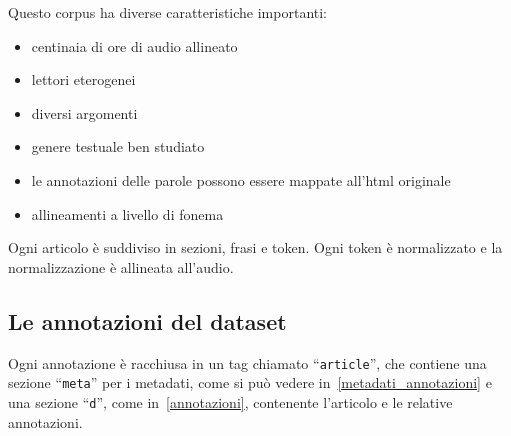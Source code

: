 \documentclass[12pt,a4paper,titlepage]{article}
\begin{document}
Questo corpus ha diverse caratteristiche importanti:
\begin{itemize}
	\item centinaia di ore di audio allineato
	\item lettori eterogenei
	\item diversi argomenti
	\item genere testuale ben studiato
	\item le annotazioni delle parole possono essere mappate all'html originale
	\item allineamenti a livello di fonema
\end{itemize}

Ogni articolo è suddiviso in sezioni, frasi e token. Ogni token è normalizzato e la normalizzazione è allineata all'audio.

\subsection{Le annotazioni del dataset}
\label{subsec:annotazioni}
Ogni annotazione è racchiusa in un tag chiamato ``\texttt{article}'', che contiene una sezione ``\texttt{meta}'' per i metadati, come si può vedere in~\ref{metadati_annotazioni} e una sezione ``\texttt{d}'', come in~\ref{annotazioni}, contenente l'articolo e le relative annotazioni.
\end{document}
